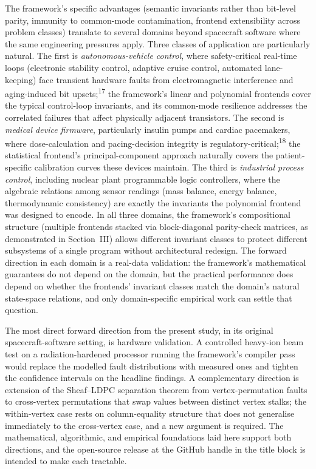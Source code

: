 \documentclass[12pt,a4paper]{article}
\theoremstyle{plain}
\theoremstyle{definition}
\begin{document}
The framework's specific advantages (semantic invariants rather than bit-level parity, immunity to common-mode contamination, frontend extensibility across problem classes) translate to several domains beyond spacecraft software where the same engineering pressures apply. Three classes of application are particularly natural. The first is \textit{autonomous-vehicle control}, where safety-critical real-time loops (electronic stability control, adaptive cruise control, automated lane-keeping) face transient hardware faults from electromagnetic interference and aging-induced bit upsets;\textsuperscript{17} the framework's linear and polynomial frontends cover the typical control-loop invariants, and its common-mode resilience addresses the correlated failures that affect physically adjacent transistors. The second is \textit{medical device firmware}, particularly insulin pumps and cardiac pacemakers, where dose-calculation and pacing-decision integrity is regulatory-critical;\textsuperscript{18} the statistical frontend's principal-component approach naturally covers the patient-specific calibration curves these devices maintain. The third is \textit{industrial process control}, including nuclear plant programmable logic controllers, where the algebraic relations among sensor readings (mass balance, energy balance, thermodynamic consistency) are exactly the invariants the polynomial frontend was designed to encode. In all three domains, the framework's compositional structure (multiple frontends stacked via block-diagonal parity-check matrices, as demonstrated in Section~III) allows different invariant classes to protect different subsystems of a single program without architectural redesign. The forward direction in each domain is a real-data validation: the framework's mathematical guarantees do not depend on the domain, but the practical performance does depend on whether the frontends' invariant classes match the domain's natural state-space relations, and only domain-specific empirical work can settle that question.

The most direct forward direction from the present study, in its original spacecraft-software setting, is hardware validation. A controlled heavy-ion beam test on a radiation-hardened processor running the framework's compiler pass would replace the modelled fault distributions with measured ones and tighten the confidence intervals on the headline findings. A complementary direction is extension of the Sheaf--LDPC separation theorem from vertex-permutation faults to cross-vertex permutations that swap values between distinct vertex stalks; the within-vertex case rests on column-equality structure that does not generalise immediately to the cross-vertex case, and a new argument is required. The mathematical, algorithmic, and empirical foundations laid here support both directions, and the open-source release at the GitHub handle in the title block is intended to make each tractable.
\end{document}

